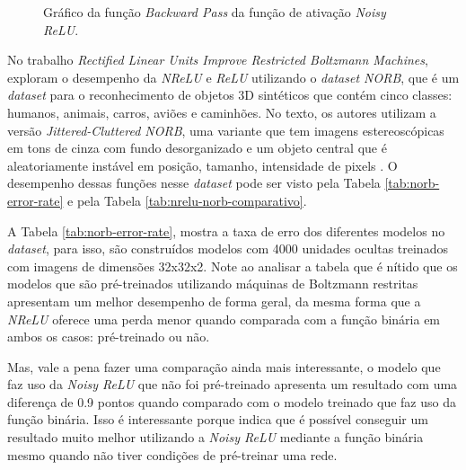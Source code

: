 \begin{figure}[htbp] %
    \centering %
    \caption{Gráfico da função \textit{Backward Pass} da função de ativação \textit{Noisy ReLU}.}
    \label{fig:nrelu-derivada}
\end{figure}

No trabalho \textit{Rectified Linear Units Improve Restricted Boltzmann Machines}, \textcite{Nair2010} exploram o desempenho da \textit{NReLU} e \textit{ReLU} utilizando o \textit{dataset NORB}, que é um \textit{dataset} para o reconhecimento de objetos 3D sintéticos que contém cinco classes: humanos, animais, carros, aviões e caminhões. No texto, os autores utilizam a versão \textit{Jittered-Cluttered NORB}, uma variante que tem imagens estereoscópicas em tons de cinza com fundo desorganizado e um objeto central que é aleatoriamente instável em posição, tamanho, intensidade de pixels \parencite{Nair2010}. O desempenho dessas funções nesse \textit{dataset} pode ser visto pela Tabela \ref{tab:norb-error-rate} e pela Tabela \ref{tab:nrelu-norb-comparativo}.

A Tabela \ref{tab:norb-error-rate}, mostra a taxa de erro dos diferentes modelos no \textit{dataset}, para isso, são construídos modelos com 4000 unidades ocultas treinados com imagens de dimensões 32x32x2. Note ao analisar a tabela que é nítido que os modelos que são pré-treinados utilizando máquinas de Boltzmann restritas apresentam um melhor desempenho de forma geral, da mesma forma que a \textit{NReLU} oferece uma perda menor quando comparada com a função binária em ambos os casos: pré-treinado ou não. 

Mas, vale a pena fazer uma comparação ainda mais interessante, o modelo que faz uso da \textit{Noisy ReLU} que não foi pré-treinado apresenta um resultado com uma diferença de 0.9 pontos quando comparado com o modelo treinado que faz uso da função binária. Isso é interessante porque indica que é possível conseguir um resultado muito melhor utilizando a \textit{Noisy ReLU} mediante a função binária mesmo quando não tiver condições de pré-treinar uma rede.

